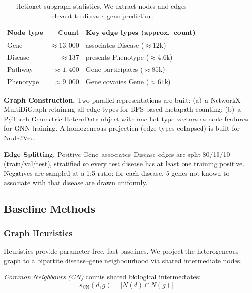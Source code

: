 \documentclass{article}
\DeclareMathOperator{\CN}{CN}
\begin{document}
\begin{table}[h]
\centering
\small
\caption{Hetionet subgraph statistics. We extract nodes and edges relevant to disease--gene prediction.}
\label{tab:data}
\vspace{-0.5em}
\begin{tabular}{lrp{4.5cm}}
\toprule
\textbf{Node type} & \textbf{Count} & \textbf{Key edge types (approx.\ count)} \\
\midrule
Gene      & ${\approx}13{,}000$ & associates Disease (${\approx}12$k) \\
Disease   & ${\approx}137$      & presents Phenotype (${\approx}4.6$k) \\
Pathway   & ${\approx}1{,}400$  & Gene participates (${\approx}85$k) \\
Phenotype & ${\approx}9{,}000$  & Gene covaries Gene (${\approx}61$k) \\
\bottomrule
\end{tabular}
\end{table}

\textbf{Graph Construction.} Two parallel representations are built: (a)~a NetworkX MultiDiGraph retaining all edge types for BFS-based metapath counting; (b)~a PyTorch Geometric HeteroData object with one-hot type vectors as node features for GNN training. A homogeneous projection (edge types collapsed) is built for Node2Vec.

\textbf{Edge Splitting.} Positive Gene--associates--Disease edges are split 80/10/10 (train/val/test), stratified so every test disease has at least one training positive. Negatives are sampled at a 1:5 ratio: for each disease, 5 genes not known to associate with that disease are drawn uniformly.

\subsection{Baseline Methods}

\subsubsection{Graph Heuristics}

Heuristics provide parameter-free, fast baselines. We project the heterogeneous graph to a bipartite disease--gene neighbourhood via shared intermediate nodes.

\textit{Common Neighbours (CN)} counts shared biological intermediates:
\begin{equation}
s_{\CN}(d,g) = |N(d) \cap N(g)|
\label{eq:cn}
\end{equation}
\end{document}

